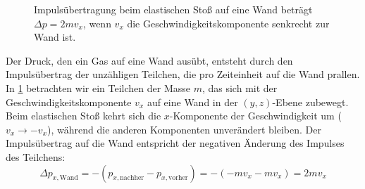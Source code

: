 \begin{figure}[htb]
{
    }
    \caption{Impulsübertragung beim elastischen Stoß auf eine Wand beträgt $\Delta p = 2mv_x$, wenn $v_x$ die Geschwindigkeitskomponente senkrecht zur Wand ist.}\label{fig: impulsuebertrag_wand}
\end{figure}

Der Druck, den ein Gas auf eine Wand ausübt, entsteht durch den Impulsübertrag der unzähligen Teilchen, die pro Zeiteinheit auf die Wand prallen.
In \cref{fig: impulsuebertrag_wand} betrachten wir ein Teilchen der Masse $m$, das sich mit der Geschwindigkeitskomponente $v_x$ auf eine Wand in der $(y,z)$-Ebene zubewegt. Beim elastischen Stoß kehrt sich die $x$-Komponente der Geschwindigkeit um ($v_x \rightarrow -v_x$), während die anderen Komponenten unverändert bleiben. Der Impulsübertrag auf die Wand entspricht der negativen Änderung des Impulses des Teilchens:
\begin{equation}
    \Delta p_{x, \text{Wand}} = -(p_{x,\text{nachher}} - p_{x,\text{vorher}}) = -(-mv_x - mv_x) = 2mv_x
\end{equation}


